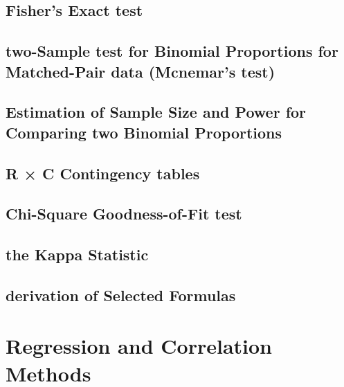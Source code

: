 \documentclass[12pt,]{article}
\begin{document}
\hypertarget{fishers-exact-test}{%
\subsection{Fisher's Exact test}\label{fishers-exact-test}}

\hypertarget{two-sample-test-for-binomial-proportions-for-matched-pair-data-mcnemars-test}{%
\subsection{two-Sample test for Binomial Proportions for Matched-Pair
data (Mcnemar's
test)}\label{two-sample-test-for-binomial-proportions-for-matched-pair-data-mcnemars-test}}

\hypertarget{estimation-of-sample-size-and-power-for-comparing-two-binomial-proportions}{%
\subsection{Estimation of Sample Size and Power for Comparing two
Binomial
Proportions}\label{estimation-of-sample-size-and-power-for-comparing-two-binomial-proportions}}

\hypertarget{r-c-contingency-tables}{%
\subsection{R × C Contingency tables}\label{r-c-contingency-tables}}

\hypertarget{chi-square-goodness-of-fit-test}{%
\subsection{Chi-Square Goodness-of-Fit
test}\label{chi-square-goodness-of-fit-test}}

\hypertarget{the-kappa-statistic}{%
\subsection{the Kappa Statistic}\label{the-kappa-statistic}}

\hypertarget{derivation-of-selected-formulas}{%
\subsection{derivation of Selected
Formulas}\label{derivation-of-selected-formulas}}

\hypertarget{regression-and-correlation-methods}{%
\section{Regression and Correlation
Methods}\label{regression-and-correlation-methods}}
\end{document}
